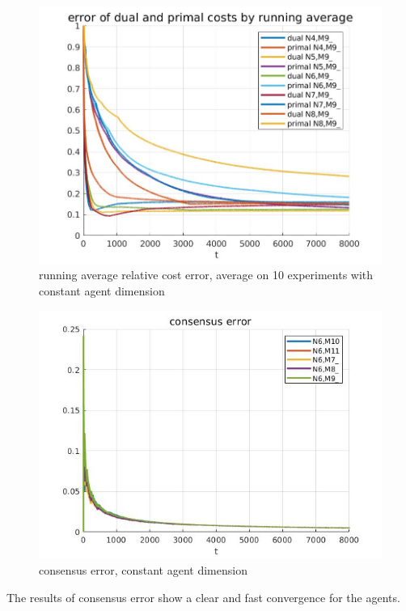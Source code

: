 \documentclass{article}
\begin{document}
\begin{figure}[h!]
    \centering
    \includegraphics[scale=0.36]{images/aggr_REP10_CostPlot_M9_[N5]_.jpg}
    \caption{running average relative cost error, average on 10 experiments with constant agent dimension}
    \label{fig:running average cost error plot}
\end{figure}
\begin{figure}[h!]
    \centering
    \includegraphics[scale=0.5]{images/aggr_REP10_ConsPlot_N6_[M9]_.jpg}
    \caption{consensus error,  constant agent dimension}
    \label{fig:running average cost error plot}
\end{figure}
\newpage
\newpage
The results of consensus error show a clear and fast convergence for the agents.\\
\end{document}
